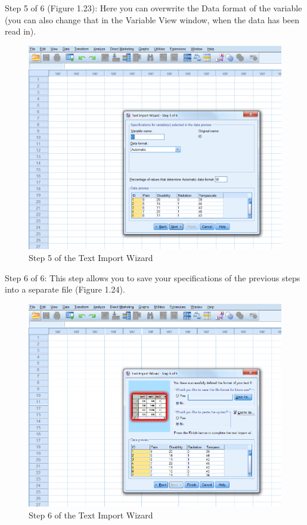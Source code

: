 \documentclass[]{book}
\begin{document}
Step 5 of 6 (Figure 1.23): Here you can overwrite the Data format of the
variable (you can also change that in the Variable View window, when the
data has been read in).

\begin{figure}

{\centering \includegraphics[width=0.9\linewidth]{images/fig1.23} 

}

\caption{Step 5 of the Text Import Wizard}\label{fig:fig23}
\end{figure}

Step 6 of 6: This step allows you to save your specifications of the
previous steps into a separate file (Figure 1.24).

\begin{figure}

{\centering \includegraphics[width=0.9\linewidth]{images/fig1.24} 

}

\caption{Step 6 of the Text Import Wizard}\label{fig:fig24}
\end{figure}
\end{document}
